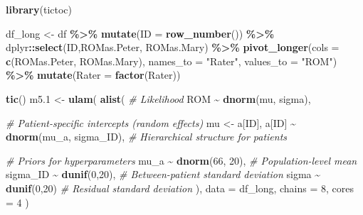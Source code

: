 \documentclass[
]{book}
\newenvironment{Shaded}{\begin{snugshade}}{\end{snugshade}}
\newcommand{\AttributeTok}[1]{\textcolor[rgb]{0.13,0.29,0.53}{#1}}
\newcommand{\CommentTok}[1]{\textcolor[rgb]{0.56,0.35,0.01}{\textit{#1}}}
\newcommand{\DecValTok}[1]{\textcolor[rgb]{0.00,0.00,0.81}{#1}}
\newcommand{\FloatTok}[1]{\textcolor[rgb]{0.00,0.00,0.81}{#1}}
\newcommand{\FunctionTok}[1]{\textcolor[rgb]{0.13,0.29,0.53}{\textbf{#1}}}
\newcommand{\NormalTok}[1]{#1}
\newcommand{\OtherTok}[1]{\textcolor[rgb]{0.56,0.35,0.01}{#1}}
\newcommand{\SpecialCharTok}[1]{\textcolor[rgb]{0.81,0.36,0.00}{\textbf{#1}}}
\newcommand{\StringTok}[1]{\textcolor[rgb]{0.31,0.60,0.02}{#1}}
\begin{document}
\begin{Shaded}
\begin{Highlighting}[]
\FunctionTok{library}\NormalTok{(tictoc)}

\NormalTok{df\_long }\OtherTok{\textless{}{-}}\NormalTok{ df }\SpecialCharTok{\%\textgreater{}\%} 
  \FunctionTok{mutate}\NormalTok{(}\AttributeTok{ID =} \FunctionTok{row\_number}\NormalTok{()) }\SpecialCharTok{\%\textgreater{}\%}
\NormalTok{  dplyr}\SpecialCharTok{::}\FunctionTok{select}\NormalTok{(ID,ROMas.Peter, ROMas.Mary) }\SpecialCharTok{\%\textgreater{}\%} 
  \FunctionTok{pivot\_longer}\NormalTok{(}\AttributeTok{cols =} \FunctionTok{c}\NormalTok{(ROMas.Peter, ROMas.Mary), }
               \AttributeTok{names\_to =} \StringTok{"Rater"}\NormalTok{, }\AttributeTok{values\_to =} \StringTok{"ROM"}\NormalTok{) }\SpecialCharTok{\%\textgreater{}\%} 
  \FunctionTok{mutate}\NormalTok{(}\AttributeTok{Rater =} \FunctionTok{factor}\NormalTok{(Rater))}

\FunctionTok{tic}\NormalTok{()}
\NormalTok{m5}\FloatTok{.1} \OtherTok{\textless{}{-}} \FunctionTok{ulam}\NormalTok{(}
  \FunctionTok{alist}\NormalTok{(}
    \CommentTok{\# Likelihood}
\NormalTok{    ROM }\SpecialCharTok{\textasciitilde{}} \FunctionTok{dnorm}\NormalTok{(mu, sigma),}
    
    \CommentTok{\# Patient{-}specific intercepts (random effects)}
\NormalTok{    mu }\OtherTok{\textless{}{-}}\NormalTok{ a[ID],  }
\NormalTok{    a[ID] }\SpecialCharTok{\textasciitilde{}} \FunctionTok{dnorm}\NormalTok{(mu\_a, sigma\_ID),  }\CommentTok{\# Hierarchical structure for patients}
    
    \CommentTok{\# Priors for hyperparameters}
\NormalTok{    mu\_a }\SpecialCharTok{\textasciitilde{}} \FunctionTok{dnorm}\NormalTok{(}\DecValTok{66}\NormalTok{, }\DecValTok{20}\NormalTok{),  }\CommentTok{\# Population{-}level mean}
\NormalTok{    sigma\_ID }\SpecialCharTok{\textasciitilde{}} \FunctionTok{dunif}\NormalTok{(}\DecValTok{0}\NormalTok{,}\DecValTok{20}\NormalTok{),  }\CommentTok{\# Between{-}patient standard deviation}
\NormalTok{    sigma }\SpecialCharTok{\textasciitilde{}} \FunctionTok{dunif}\NormalTok{(}\DecValTok{0}\NormalTok{,}\DecValTok{20}\NormalTok{)  }\CommentTok{\# Residual standard deviation}
\NormalTok{  ), }
  \AttributeTok{data =}\NormalTok{ df\_long, }
  \AttributeTok{chains =} \DecValTok{8}\NormalTok{, }\AttributeTok{cores =} \DecValTok{4}
\NormalTok{)}
\end{Highlighting}
\end{Shaded}
\end{document}
